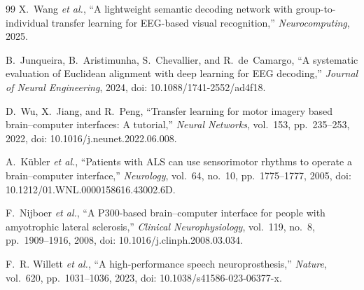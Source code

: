 \documentclass[conference]{IEEEtran}
\begin{document}
\begin{thebibliography}{99}
X.~Wang \textit{et al.}, ``A lightweight semantic decoding network with
group-to-individual transfer learning for EEG-based visual recognition,''
\textit{Neurocomputing}, 2025.

B.~Junqueira, B.~Aristimunha, S.~Chevallier, and R.~de~Camargo, ``A
systematic evaluation of Euclidean alignment with deep learning for EEG
decoding,'' \textit{Journal of Neural Engineering}, 2024,
doi: 10.1088/1741-2552/ad4f18.

D.~Wu, X.~Jiang, and R.~Peng, ``Transfer learning for motor imagery based
brain--computer interfaces: A tutorial,'' \textit{Neural Networks},
vol.~153, pp.~235--253, 2022, doi: 10.1016/j.neunet.2022.06.008.

A.~K\"ubler \textit{et al.}, ``Patients with ALS can use sensorimotor rhythms
to operate a brain--computer interface,'' \textit{Neurology}, vol.~64,
no.~10, pp.~1775--1777, 2005, doi: 10.1212/01.WNL.0000158616.43002.6D.

F.~Nijboer \textit{et al.}, ``A P300-based brain--computer interface for
people with amyotrophic lateral sclerosis,'' \textit{Clinical
Neurophysiology}, vol.~119, no.~8, pp.~1909--1916, 2008,
doi: 10.1016/j.clinph.2008.03.034.

F.~R. Willett \textit{et al.}, ``A high-performance speech neuroprosthesis,''
\textit{Nature}, vol.~620, pp.~1031--1036, 2023,
doi: 10.1038/s41586-023-06377-x.

\end{thebibliography}
\end{document}
